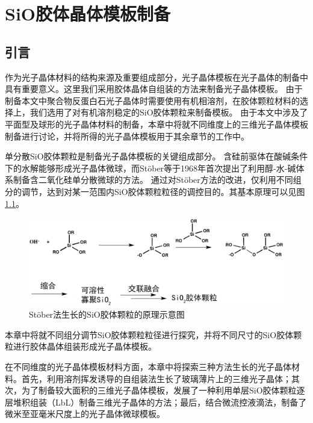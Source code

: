 
\chapter{SiO{\heiti{}}胶体晶体模板制备}
\label{ch:synth_PhC}

\section{引言}
作为光子晶体材料的结构来源及重要组成部分，光子晶体模板在光子晶体的制备中具有重要意义。这里我们采用胶体晶体自组装的方法来制备光子晶体模板。
由于制备本文中聚合物反蛋白石光子晶体时需要使用有机相溶剂，在胶体颗粒材料的选择上，我们选用了对有机溶剂稳定的SiO胶体颗粒来制备模板。
由于本文中涉及了平面型及球形的光子晶体材料的制备，本章中将就不同维度上的三维光子晶体模板制备进行讨论，并将所得的光子晶体模板用于其余章节的工作中。

单分散SiO胶体颗粒是制备光子晶体模板的关键组成部分。
含硅前驱体在酸碱条件下的水解能够形成光子晶体微球，而Stöber等于1968年首次提出了利用醇-水-碱体系制备含二氧化硅单分散微球的方法\cite{Stoeber1968Controlled}。
通过对Stöber方法的改进，仅利用不同组分的调节，达到对某一范围内SiO胶体颗粒粒径的调控目的。其基本原理可以见图\ref{fig:stoeber}。
\begin{figure}[b]
	\centering
	\includegraphics[width=\linewidth]{figures/ch2-stoeber.png}
	\caption{Stöber法生长的SiO胶体颗粒的原理示意图}
	\label{fig:stoeber}
\end{figure}
本章中将就不同组分调节SiO胶体颗粒粒径进行探究，并将不同尺寸的SiO胶体颗粒进行胶体晶体组装形成光子晶体模板。

在不同维度的光子晶体模板材料方面，本章中将探索三种方法生长的光子晶体材料。首先，利用溶剂挥发诱导的自组装法生长了玻璃薄片上的三维光子晶体；其次，为了制备较大面积的三维光子晶体模板，发展了一种利用单层SiO胶体颗粒逐层堆积组装（LbL）制备三维光子晶体的方法；最后，结合微流控液滴法，制备了微米至亚毫米尺度上的光子晶体微球模板。

